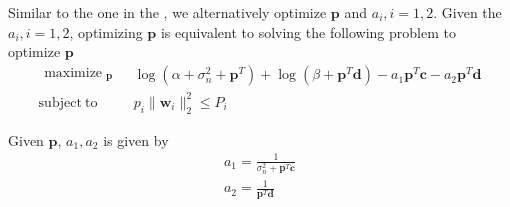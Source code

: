 \documentclass[conference]{IEEEtran}
\begin{document}
Similar to the one in the \cite{7015632}, we alternatively optimize $\mathbf{p}$ and $a_i, i = 1,2$. Given the $a_i, i = 1,2$, optimizing $\mathbf{p}$ is equivalent to solving the  following problem to optimize $\mathbf{p}$
\begin{equation}\label{eq:optimize p}
\begin{array}{ll}
\begin{split}
\mathop{\text{maximize}}_{\substack{\mathbf{p}}} 
\end{split}  
& \log(\alpha+\sigma_n^2 + \mathbf{p}^T) + \log(\beta + \mathbf{p}^T\mathbf{d}) - a_1\mathbf{p}^T\mathbf{c} - a_2\mathbf{p}^T\mathbf{d}\\
\mathrm{subject~to}
& p_i\|\mathbf{w}_i\|_2^2 \leq P_i
\end{array}
\end{equation}

Given $\mathbf{p}$, $a_1, a_2$ is given by
\begin{eqnarray}
a_1= \frac{1}{\sigma_n^2 + \mathbf{p}^T\mathbf{c}}\\
a_2= \frac{1}{\mathbf{p}^T\mathbf{d}}
\end{eqnarray}
%
\end{document}
